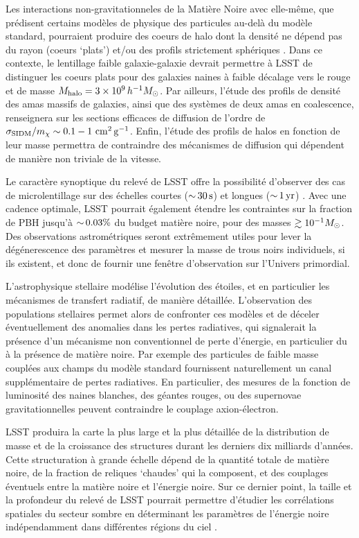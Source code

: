 \documentclass[12pt]{article}
\begin{document}
Les interactions non-gravitationneles de la Matière Noire avec elle-même, que prédisent certains modèles de physique des particules au-delà du modèle standard, pourraient produire des coeurs de halo dont la densité ne dépend pas du rayon (coeurs `plats')\citep[coeurs `plats', ][]{Spergel:1999mh} et/ou des profils strictement sphériques \citep{Peter:2013}.
Dans ce contexte, le lentillage faible galaxie-galaxie devrait permettre à LSST de distinguer les coeurs plats pour des galaxies naines à faible décalage vers le rouge et de masse $M_\text{halo} = 3\times10^9\,h^{-1}M_\odot$. Par ailleurs, l'étude des profils de densité des amas massifs de galaxies, ainsi que des systèmes de deux amas en coalescence, renseignera sur les sections efficaces de diffusion de l'ordre de $\sigma_{\rm SIDM}/m_\chi \sim 0.1-1 \mathrm{\,\mathrm{\,cm}^2\mathrm{\,g}^{-1}}$. Enfin, l'étude des profils de halos en fonction de leur masse permettra de contraindre des mécanismes de diffusion qui dépendent de manière non triviale de la vitesse. 

Le caractère synoptique du relevé de LSST offre la possibilité d'observer des cas de microlentillage sur des échelles courtes ($ {\sim}\, 30 \mathrm{\,s}$) et longues ($ {\sim}\,1 \mathrm{\,yr}$) \citep{1509.04899}. 
Avec une cadence optimale, LSST pourrait également étendre les contraintes sur la fraction de PBH jusqu'à $ {\sim}\,0.03\%$ du budget matière noire, pour des masses $\gtrsim 10^{-1} M_\odot$. Des observations astrométriques seront extrêmement utiles pour lever la dégénerescence des paramètres et mesurer la masse de trous noirs individuels, si ils existent, et donc de fournir une fenêtre d'observation sur l'Univers primordial.

L'astrophysique stellaire modélise l'évolution des étoiles, et en particulier les mécanismes de transfert radiatif, de manière détaillée. L'observation des populations stellaires permet alors de confronter ces modèles et de déceler éventuellement des anomalies dans les pertes radiatives, qui signalerait la présence d'un mécanisme non conventionnel de perte d'énergie, en particulier du à la présence de matière noire. Par exemple des particules de faible masse couplées aux champs du modèle standard fournissent naturellement un canal supplémentaire de pertes radiatives. En particulier, des mesures de la fonction de luminosité des naines blanches, des géantes rouges, ou des supernovae gravitationnelles peuvent contraindre le couplage axion-électron.

 LSST produira la carte la plus large et la plus détaillée de la distribution de masse et de la croissance des structures durant les derniers dix milliards d'années. Cette structuration à grande échelle dépend de la quantité totale de matière noire, de la fraction de reliques `chaudes' qui la composent, et des couplages éventuels entre la matière noire et l'énergie noire. Sur ce dernier point, la taille et la profondeur du relevé de LSST pourrait permettre d'étudier les corrélations spatiales du secteur sombre en déterminant les paramètres de l'énergie noire indépendamment dans différentes régions du ciel \citep{0902.2590}.
\end{document}
